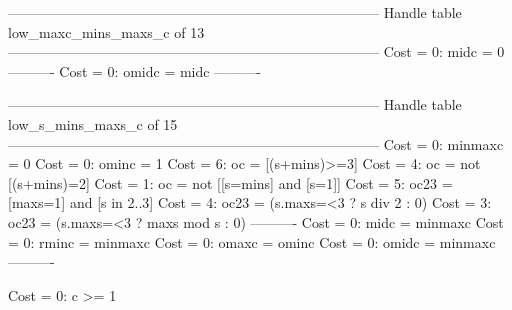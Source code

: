 --------------------------------------------------------------------------------
Handle table low_maxc_mins_maxs_c of 13
--------------------------------------------------------------------------------
Cost =  0:  midc  = 0
----------
Cost =  0:  omidc = midc
----------


--------------------------------------------------------------------------------
Handle table low_s_mins_maxs_c of 15
--------------------------------------------------------------------------------
Cost =  0:  minmaxc = 0
Cost =  0:  ominc   = 1
Cost =  6:  oc      = [(s+mins)>=3]
Cost =  4:  oc      = not [(s+mins)=2]
Cost =  1:  oc      = not [[s=mins] and [s=1]]
Cost =  5:  oc23    = [maxs=1] and [s in 2..3]
Cost =  4:  oc23    = (s.maxs=<3 ? s div 2 : 0)
Cost =  3:  oc23    = (s.maxs=<3 ? maxs mod s : 0)
----------
Cost =  0:  midc    = minmaxc
Cost =  0:  rminc   = minmaxc
Cost =  0:  omaxc   = ominc
Cost =  0:  omidc   = minmaxc
----------

Cost =  0:  c >= 1
